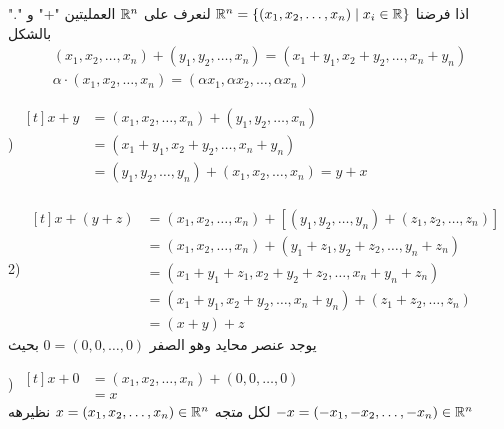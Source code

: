 \begin{example}
	اذا فرضنا $\mathbb{R}^n = \{(x_1, x_2, \dots, x_n ) \mid x_i \in \mathbb{R}\}$ لنعرف على $\mathbb{R}^n$ العمليتين "+" و "." بالشكل
	\begin{gather*}
		(x_1, x_2, \dots, x_n) + (y_1, y_2, \dots, x_n) = (x_1+y_1, x_2+y_2, \dots, x_n + y_n)\\
		\alpha \cdot (x_1, x_2, \dots, x_n) = (\alpha x_1, \alpha x_2, \dots, \alpha x_n)
	\end{gather*}
	
) $
	\begin{aligned}[t]
			x + y &= (x_1, x_2, \dots, x_n) + (y_1, y_2, \dots, x_n)\\
		&= (x_1+y_1, x_2+y_2, \dots, x_n + y_n)\\
		&= (y_1, y_2, \dots, y_n) + (x_1, x_2, \dots, x_n) = y + x
	\end{aligned}
	$\\ \\
	2) $
	\begin{aligned}[t]
		x + (y + z) &= (x_1, x_2, \dots, x_n) + [(y_1, y_2, \dots, y_n) + (z_1, z_2, \dots, z_n)]\\
		&= (x_1, x_2, \dots, x_n) + (y_1+z_1, y_2+z_2, \dots, y_n+z_n)\\
		&=  (x_1+y_1+z_1, x_2+y_2+z_2, \dots, x_n+y_n+z_n)\\
		&=  (x_1+y_1, x_2+y_2, \dots, x_n+y_n) + (z_1+z_2,\dots,z_n)\\
		&= (x+y) + z
	\end{aligned}
	$\\

		\noindent
	يوجد عنصر محايد وهو الصفر $0 = (0, 0, \dots, 0)$ بحيث
	
	) $
	\begin{aligned}[t]
		x + 0 &= (x_1,x_2,\dots,x_n) + (0, 0, \dots, 0)\\
		&= x
	\end{aligned}
	$\\
	
	\noindent
	لكل متجه $x = (x_1, x_2, \dots, x_n) \in \mathbb{R}^n$ نظيرهه $-x = (-x_1, -x_2, \dots, -x_n) \in \mathbb{R}^n$
	

\end{example}
